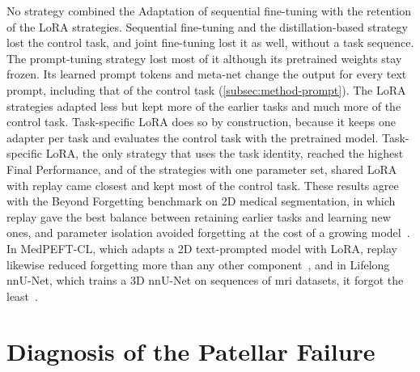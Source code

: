 No strategy combined the Adaptation of sequential fine-tuning with the retention of the LoRA strategies.
Sequential fine-tuning and the distillation-based strategy lost the control task, and joint fine-tuning lost it as well, without a task sequence.
The prompt-tuning strategy lost most of it although its pretrained weights stay frozen.
Its learned prompt tokens and meta-net change the output for every text prompt, including that of the control task (\cref{subsec:method-prompt}).
The LoRA strategies adapted less but kept more of the earlier tasks and much more of the control task.
Task-specific LoRA does so by construction, because it keeps one adapter per task and evaluates the control task with the pretrained model.
Task-specific LoRA, the only strategy that uses the task identity, reached the highest Final Performance, and of the strategies with one parameter set, shared LoRA with replay came closest and kept most of the control task.
These results agree with the Beyond Forgetting benchmark on 2D medical segmentation, in which replay gave the best balance between retaining earlier tasks and learning new ones, and parameter isolation avoided forgetting at the cost of a growing model~\cite[Sec.~5]{wang2026beyondforgetting}.
In MedPEFT-CL, which adapts a 2D text-prompted model with LoRA, replay likewise reduced forgetting more than any other component~\cite[Table~8]{gao2026medpeftcl}, and in Lifelong nnU-Net, which trains a 3D nnU-Net on sequences of \gls{mri} datasets, it forgot the least~\cite{gonzalez2023lifelong}.

\section{Diagnosis of the Patellar Failure}
\label{sec:exp-patellar}


